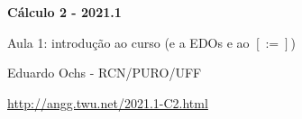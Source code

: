 \documentclass[oneside,12pt]{article}
\begin{document}


\long{}
\long{}
\long{}
\long{}
\long{}
\long{}
\long{}
\long{}
\long{}
\long{}
\long{}

\long{}
\long{}

\def\frown{\ensuremath{{=}{(}}}
\def\True {\mathbf{V}}
\def\False{\mathbf{F}}
\def\D    {\displaystyle}

\def\rotl#1{\rotatebox{90}{$#1$}}
\def\rotr#1{\rotatebox{270}{$#1$}}

\def\drafturl{http://angg.twu.net/LATEX/2021-1-C2.pdf}
\def\drafturl{http://angg.twu.net/2021.1-C2.html}
\def\draftfooter{\tiny \href{\drafturl}{\jobname{}} \ColorBrown{\shorttoday{} \hours}}



%

\thispagestyle{empty}

\begin{center}

\vspace*{1.2cm}

{\bf \Large Cálculo 2 - 2021.1}

\bsk

Aula 1: introdução ao curso (e a EDOs e ao $[:=]$)

\bsk

Eduardo Ochs - RCN/PURO/UFF

\url{http://angg.twu.net/2021.1-C2.html}

\end{center}
\end{document}
